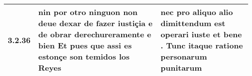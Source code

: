 \begin{tabular}{|p{1cm}|p{6.5cm}|p{6.5cm}|}

\hline
3.2.36 & nin por otro ninguon non deue dexar de fazer iustiçia \textbf{ e de obrar derechureramente e bien } Et pues que assi es estonçe son temidos los Reyes & nec pro aliquo alio \textbf{ dimittendum est operari iuste et bene . } Tunc itaque ratione personarum punitarum \\\hline

\end{tabular}
